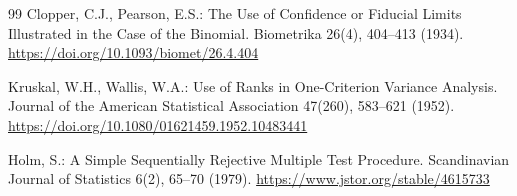 \begin{thebibliography}{99}
Clopper, C.J., Pearson, E.S.: The Use of Confidence or Fiducial Limits Illustrated in the Case of the Binomial. Biometrika 26(4), 404--413 (1934). \url{https://doi.org/10.1093/biomet/26.4.404}

Kruskal, W.H., Wallis, W.A.: Use of Ranks in One-Criterion Variance Analysis. Journal of the American Statistical Association 47(260), 583--621 (1952). \url{https://doi.org/10.1080/01621459.1952.10483441}

Holm, S.: A Simple Sequentially Rejective Multiple Test Procedure. Scandinavian Journal of Statistics 6(2), 65--70 (1979). \url{https://www.jstor.org/stable/4615733}

\end{thebibliography}
